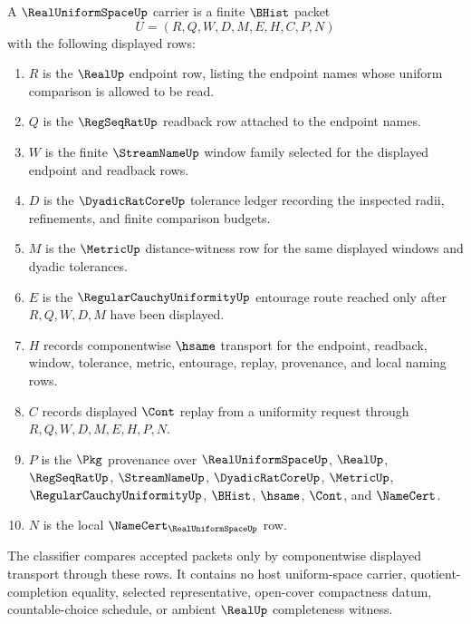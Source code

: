\begin{definition}
\label{def:real-uniform-space-carrier}
A $\RealUniformSpaceUp$ carrier is a finite $\BHist$ packet
$$
U=(R,Q,W,D,M,E,H,C,P,N)
$$
with the following displayed rows:
\begin{enumerate}
\item $R$ is the $\RealUp$ endpoint row, listing the endpoint names whose uniform comparison is allowed to be read.
\item $Q$ is the $\RegSeqRatUp$ readback row attached to the endpoint names.
\item $W$ is the finite $\StreamNameUp$ window family selected for the displayed endpoint and readback rows.
\item $D$ is the $\DyadicRatCoreUp$ tolerance ledger recording the inspected radii, refinements, and finite comparison budgets.
\item $M$ is the $\MetricUp$ distance-witness row for the same displayed windows and dyadic tolerances.
\item $E$ is the $\RegularCauchyUniformityUp$ entourage route reached only after $R,Q,W,D,M$ have been displayed.
\item $H$ records componentwise $\hsame$ transport for the endpoint, readback, window, tolerance, metric, entourage, replay, provenance, and local naming rows.
\item $C$ records displayed $\Cont$ replay from a uniformity request through $R,Q,W,D,M,E,H,P,N$.
\item $P$ is the $\Pkg$ provenance over $\RealUniformSpaceUp$, $\RealUp$, $\RegSeqRatUp$, $\StreamNameUp$, $\DyadicRatCoreUp$, $\MetricUp$, $\RegularCauchyUniformityUp$, $\BHist$, $\hsame$, $\Cont$, and $\NameCert$.
\item $N$ is the local $\NameCert_{\RealUniformSpaceUp}$ row.
\end{enumerate}
The classifier compares accepted packets only by componentwise displayed transport through these rows. It contains no host uniform-space carrier, quotient-completion equality, selected representative, open-cover compactness datum, countable-choice schedule, or ambient $\RealUp$ completeness witness.
\end{definition}

